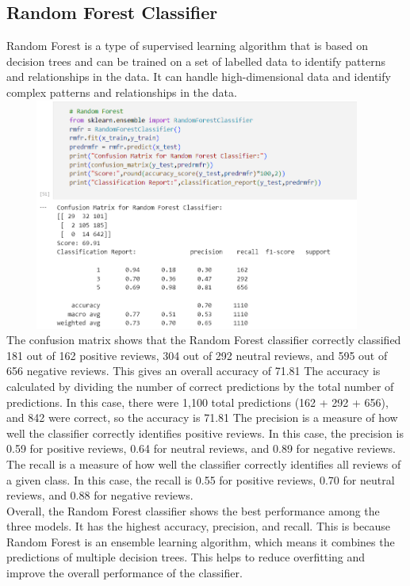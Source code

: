 \documentclass[a4paper, 12pt]{report}
\begin{document}
\subsection{Random Forest Classifier}
Random Forest is a type of supervised learning algorithm that is based on decision trees and can be trained on a set of labelled data to identify patterns and relationships in the data. It can handle high-dimensional data and identify complex patterns and relationships in the data. \\
\includegraphics[height=3in,width=5in]{18}\\
The confusion matrix shows that the Random Forest classifier correctly classified 181 out of 162 positive reviews, 304 out of 292 neutral reviews, and 595 out of 656 negative reviews. This gives an overall accuracy of 71.81%
The accuracy is calculated by dividing the number of correct predictions by the total number of predictions. In this case, there were 1,100 total predictions (162 + 292 + 656), and 842 were correct, so the accuracy is 71.81%
The precision is a measure of how well the classifier correctly identifies positive reviews. In this case, the precision is 0.59 for positive reviews, 0.64 for neutral reviews, and 0.89 for negative reviews.
The recall is a measure of how well the classifier correctly identifies all reviews of a given class. In this case, the recall is 0.55 for positive reviews, 0.70 for neutral reviews, and 0.88 for negative reviews.\\
Overall, the Random Forest classifier shows the best performance among the three models. It has the highest accuracy, precision, and recall. This is because Random Forest is an ensemble learning algorithm, which means it combines the predictions of multiple decision trees. This helps to reduce overfitting and improve the overall performance of the classifier.
\pagebreak
\end{document}
